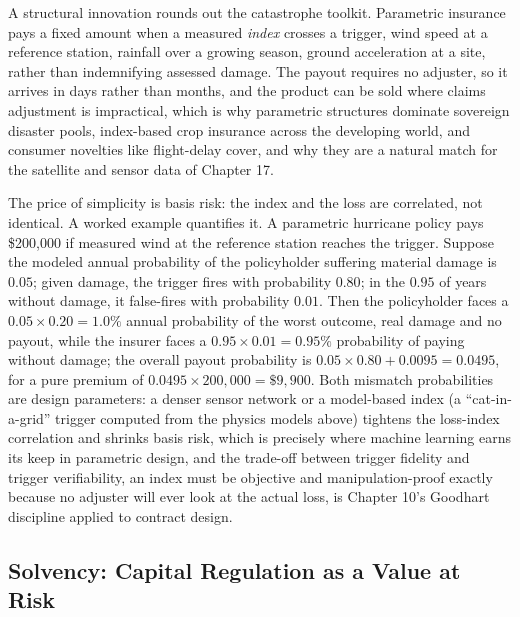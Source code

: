 \documentclass[../ai_in_finance]{subfiles}
\begin{document}
A structural innovation rounds out the catastrophe toolkit. Parametric insurance pays a fixed amount when a measured \emph{index} crosses a trigger, wind speed at a reference station, rainfall over a growing season, ground acceleration at a site, rather than indemnifying assessed damage. The payout requires no adjuster, so it arrives in days rather than months, and the product can be sold where claims adjustment is impractical, which is why parametric structures dominate sovereign disaster pools, index-based crop insurance across the developing world, and consumer novelties like flight-delay cover, and why they are a natural match for the satellite and sensor data of Chapter 17.

The price of simplicity is basis risk: the index and the loss are correlated, not identical. A worked example quantifies it. A parametric hurricane policy pays \$200{,}000 if measured wind at the reference station reaches the trigger. Suppose the modeled annual probability of the policyholder suffering material damage is $0.05$; given damage, the trigger fires with probability $0.80$; in the $0.95$ of years without damage, it false-fires with probability $0.01$. Then the policyholder faces a $0.05 \times 0.20 = 1.0\%$ annual probability of the worst outcome, real damage and no payout, while the insurer faces a $0.95 \times 0.01 = 0.95\%$ probability of paying without damage; the overall payout probability is $0.05 \times 0.80 + 0.0095 = 0.0495$, for a pure premium of $0.0495 \times 200{,}000 = \$9{,}900$. Both mismatch probabilities are design parameters: a denser sensor network or a model-based index (a ``cat-in-a-grid'' trigger computed from the physics models above) tightens the loss-index correlation and shrinks basis risk, which is precisely where machine learning earns its keep in parametric design, and the trade-off between trigger fidelity and trigger verifiability, an index must be objective and manipulation-proof exactly because no adjuster will ever look at the actual loss, is Chapter 10's Goodhart discipline applied to contract design.

\subsection{Solvency: Capital Regulation as a Value at Risk}
\label{sec:ins-solvency}
\end{document}
